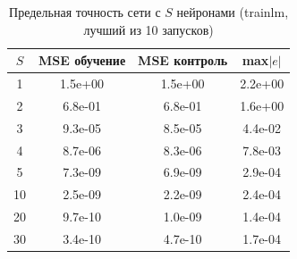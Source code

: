 \begin{table}[H]
\caption{Предельная точность сети с $S$ нейронами (trainlm, лучший из 10 запусков)}
\label{tab:capacity}
\centering
\small
\begin{tabular}{cccc}
\toprule
$S$ & MSE обучение & MSE контроль & max$|e|$ \\
\midrule
1 & 1.5e+00 & 1.5e+00 & 2.2e+00 \\
2 & 6.8e-01 & 6.8e-01 & 1.6e+00 \\
3 & 9.3e-05 & 8.5e-05 & 4.4e-02 \\
4 & 8.7e-06 & 8.3e-06 & 7.8e-03 \\
5 & 7.3e-09 & 6.9e-09 & 2.9e-04 \\
10 & 2.5e-09 & 2.2e-09 & 2.4e-04 \\
20 & 9.7e-10 & 1.0e-09 & 1.4e-04 \\
30 & 3.4e-10 & 4.7e-10 & 1.7e-04 \\
\bottomrule
\end{tabular}
\end{table}
